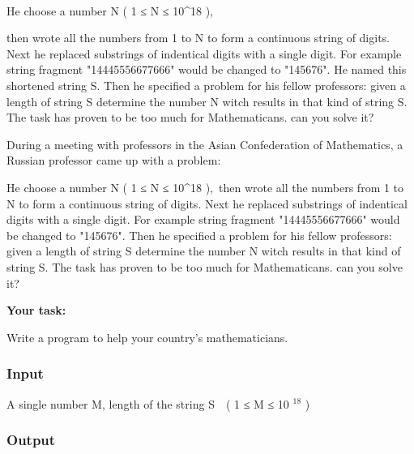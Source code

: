




\\





    He choose a number N ( 1 ≤ N ≤ 10^18 ),   

    then wrote all the numbers from 1 to N to form a continuous string of digits. Next he replaced substrings of indentical digits with a single digit. For example string fragment "14445556677666" would be changed to "145676". He named this shortened string S. Then he specified a problem for his fellow professors: given a length of string S determine the number N witch results in that kind of string S. The task has proven to be too much for Mathematicans. can you solve it?   



    During a meeting with professors in the Asian Confederation of Mathematics, a Russian professor came up with a problem:   



    He choose a number N ( 1 ≤ N ≤ 10^18 ), then wrote all the numbers from 1 to N to form a continuous string of digits. Next he replaced substrings of indentical digits with a single digit. For example string fragment "14445556677666" would be changed to "145676". Then he specified a problem for his fellow professors: given a length of string S determine the number N witch results in that kind of string S. The task has proven to be too much for Mathematicans. can you solve it?   



\textbf{     Your task:    }



    Write a program to help your country's mathematicians.   



\subsubsection{    Input   }



     A single number M, length of the string S  ( 1 ≤ M ≤ 10     $^      18     $     )    



\subsubsection{    Output   }




